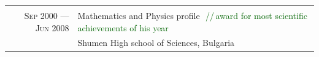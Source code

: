 \documentclass[a4paper,10pt]{article}
\def\myline{\color{linegray}\vline}
\newcommand{\minorcolor}[1]{\textcolor{mygray}{#1}}
\newcommand{\comment}[1]{\small\textcolor{darkgreen}{\,\,//\,#1}}
\newcommand{\mydate}[1]{\minorcolor{\textsc{#1}}}
\begin{document}
{\begin{tabular}{r!{\myline}p{14cm}}
       \\
        \mydate{Sep 2000 --- Jun 2008}      &   Mathematics and Physics profile
                                                \comment{award for most scientific achievements of his year}\\
                                            &   Shumen High school of Sciences, Bulgaria\\
\end{tabular}
}  %
\par\smallskip

%
%
\end{document}
